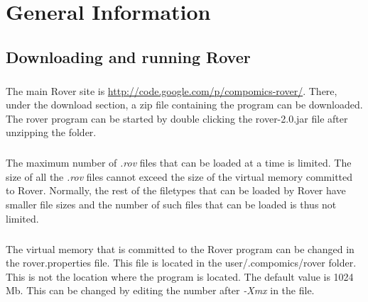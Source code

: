 \documentclass[11pt,a4paper,oneside,notitlepage]{book}
\begin{document}
\tableofcontents

\mainmatter

\chapter{General Information}
\section{Downloading and running Rover}
\paragraph{}The main Rover site is \url{http://code.google.com/p/compomics-rover/}. There, under the download section, a zip file containing the program can be downloaded. The rover program can be started by double clicking the rover-2.0.jar file after unzipping the folder.
\paragraph{}The maximum number of \textit{.rov} files that can be loaded at a time is limited. The size of all the \textit{.rov} files cannot exceed the size of the virtual memory committed to Rover. Normally, the rest of the filetypes that can be loaded by Rover have smaller file sizes and the number of such files that can be loaded is thus not limited.
\paragraph{}The virtual memory that is committed to the Rover program can be changed in the rover.properties file. This file is located in the user/.compomics/rover folder. This is not the location where the program is located. The default value is 1024 Mb. This can be changed by editing the number after \textit{-Xmx} in the file.
\end{document}

